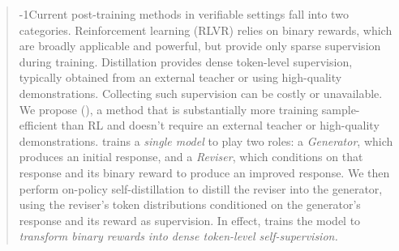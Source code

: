 \begin{abstract}


\looseness-1Current post-training methods in verifiable settings fall into two categories. Reinforcement learning (RLVR) relies on binary rewards, which are broadly applicable and powerful, but provide only sparse supervision during training. Distillation provides dense token-level supervision, typically obtained from an external teacher or using high-quality demonstrations. Collecting such supervision can be costly or unavailable.
We propose \textbf{\method{}} (\ours{}{}), a method that is substantially more training sample-efficient
than RL and doesn't require an external teacher or high-quality demonstrations. \ours{}{} trains a \emph{single model} to play two roles: a \emph{Generator}, which produces an initial response, and a \emph{Reviser}, which conditions on that response and its binary reward to produce an improved response. We then perform on-policy self-distillation to distill the reviser into the generator, using the reviser’s token distributions conditioned on the generator’s response and its reward as supervision. In effect, \ours{}{} trains the model to \textit{transform binary rewards into dense token-level self-supervision.}



\end{abstract}
